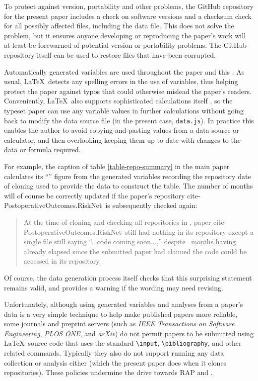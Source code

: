 \documentclass[10pt,a4paper]{article}
\begin{document}
To protect against version, portability and other problems, the GitHub repository for the present paper includes a check on software versions and a checksum check for all possibly affected files, including the data file. This does not solve the problem, but it ensures anyone developing or reproducing the paper's work will at least be forewarned of potential version or portability problems. The GitHub repository itself can be used to restore files that have been corrupted.

Automatically generated variables are used throughout the paper and this \supplement.
As usual, \LaTeX\ detects any spelling errors in the use of variables, thus helping protect the paper against typos that could otherwise mislead the paper's readers. Conveniently, \LaTeX\ also supports sophisticated calculations itself \cite{latex-calculus}, so the typeset paper can use any variable values in further calculations without going back to modify the data source file (in the present case, \texttt{data.js}). In practice this enables the author to avoid copying-and-pasting values from a data source or calculator, and then overlooking keeping them up to date with changes to the data or formula required.

For example, the caption of table \ref{table-repo-summary} in the main paper calculates its ``'' figure from the generated variables recording the repository date of cloning used to provide the data to construct the table. The number of months will of course be correctly updated if the paper's repository \csname cite-PostoperativeOutcomes.RiskNet\endcsname\ is subsequently checked again:

\begin{quote}
At the time of cloning and checking all repositories in \clonewhen, paper \csname cite-PostoperativeOutcomes.RiskNet\endcsname\ still had nothing in its repository except a single file still saying ``...code coming soon...,'' despite \the\pubdelayinmonths\ months having already elapsed since the submitted paper had claimed the code could be accessed in its repository.\end{quote}

Of course, the data generation process itself checks that this surprising statement remains valid, and provides a warning if the wording may need revising.

Unfortunately, although using generated variables and analyses from a paper's data is a very simple technique to help make published papers more reliable, some journals and preprint servers (such as \emph{IEEE Transactions on Software Engineering}, \emph{PLOS ONE}, and \emph{arXiv\/}) do not permit papers to be submitted using \LaTeX\ source code that uses the standard \texttt{\textbackslash input}, \texttt{\textbackslash bibliography}, and other related commands. Typically they also do not support running any data collection or analysis either (which the present paper does when it clones repositories). These policies undermine the drive towards RAP and \RAPstarp.
\end{document}
